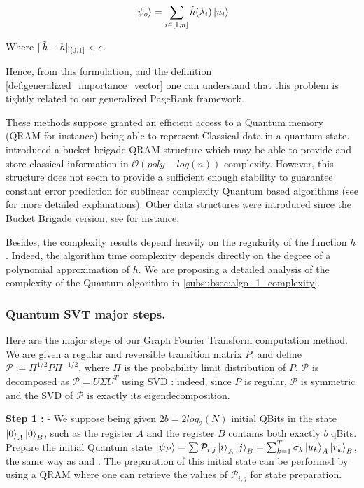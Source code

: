 \documentclass[sn-mathphys]{sn-jnl}%
\theoremstyle{thmstyleone}%
\theoremstyle{thmstyletwo}%
\theoremstyle{thmstylethree}%
\begin{document}
\begin{equation}
    \ket{\psi_o} = \sum_{i \in [1,n]} \Tilde{h}(\lambda_i) \ket{u_i} 
\end{equation}

Where $\|\Tilde{h} - h\|_{[0,1]} < \epsilon$.

Hence, from this formulation, and the definition
\ref{def:generalized_importance_vector} one can understand that this
problem is tightly related to our generalized PageRank framework.

These methods suppose granted an efficient access to a Quantum memory
(QRAM for instance) being able to represent Classical data in a
quantum state.\label{rmq:QRAM_assumptions}
\cite{giovannetti_lloyd_maccone_2008} introduced a bucket brigade QRAM
structure which may be able to provide and store classical information
in $\mathcal{O}(poly-log(n))$ complexity. However, this structure does
not seem to provide a sufficient enough stability to guarantee
constant error prediction for sublinear complexity Quantum based
algorithms (see
\cite{arunachalam_gheorghiu_jochym-oconnor_mosca_srinivasan_2015} for
more detailed explanations). Other data structures were introduced
since the Bucket Brigade version, see
\cite{park_petruccione_rhee_2019} for instance.

Besides, the complexity results depend heavily on the regularity of
the function $h$. Indeed, the algorithm time complexity depends
directly on the degree of a polynomial approximation of $h$. We are
proposing a detailed analysis of the complexity of the Quantum
algorithm in \ref{subsubsec:algo_1_complexity}.

\subsubsection{Quantum SVT major steps.}
Here are the major steps of our Graph Fourier Transform computation
method. We are given a regular and reversible transition matrix $P$,
and define $\mathcal{P} := \Pi^{1/2} P \Pi^{-1/2}$, where $\Pi$ is the
probability limit distribution of $P$. $\mathcal{P}$ is decomposed as
$\mathcal{P}= U \Sigma U^T$ using SVD : indeed, since $P$ is regular,
$\mathcal{P}$ is symmetric and the SVD of $\mathcal{P}$ is exactly its
eigendecomposition.

\textbf{Step 1 :} - We suppose being given $2b = 2 log_2(N)$ initial
QBits in the state $\ket{0}_A \ket{0}_B$, such as the register $A$ and
the register $B$ contains both exactly $b$ qBits. Prepare the initial
Quantum state
$\ket{\psi_P}=\sum \mathcal{P}_{i,j} \ket{i}_A \ket{j}_B =
\sum_{k=1}^T \sigma_k \ket{u_k}_A \ket{v_k}_B$, the same way as
\cite{lin_bao_zhang_li_wang_2019} and
\cite{duan_yuan_liu_li_2018}. The preparation of this initial state
can be performed by using a QRAM where one can retrieve the values of
$\mathcal{P}_{i,j}$ for state preparation.
\end{document}
